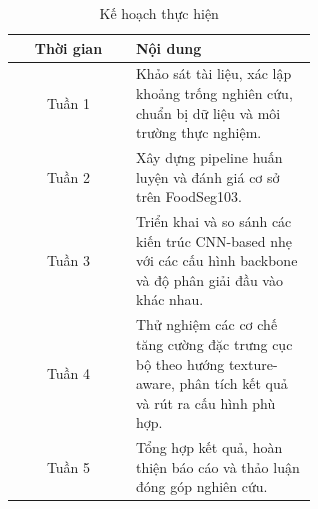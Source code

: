 \begin{table}[H]
\caption{Kế hoạch thực hiện}
\begin{center}
\begin{tabular}{|c|p{0.6\linewidth}|}
\hline
\textbf{Thời gian} & \textbf{Nội dung} \\
\hline
Tuần 1 & Khảo sát tài liệu, xác lập khoảng trống nghiên cứu, chuẩn bị dữ liệu và môi trường thực nghiệm. \\
\hline
Tuần 2 & Xây dựng pipeline huấn luyện và đánh giá cơ sở trên FoodSeg103. \\
\hline
Tuần 3 & Triển khai và so sánh các kiến trúc CNN-based nhẹ với các cấu hình backbone và độ phân giải đầu vào khác nhau. \\
\hline
Tuần 4 & Thử nghiệm các cơ chế tăng cường đặc trưng cục bộ theo hướng texture-aware, phân tích kết quả và rút ra cấu hình phù hợp. \\
\hline
Tuần 5 & Tổng hợp kết quả, hoàn thiện báo cáo và thảo luận đóng góp nghiên cứu. \\
\hline
\end{tabular}
\label{tab:schedule}
\end{center}
\end{table}
